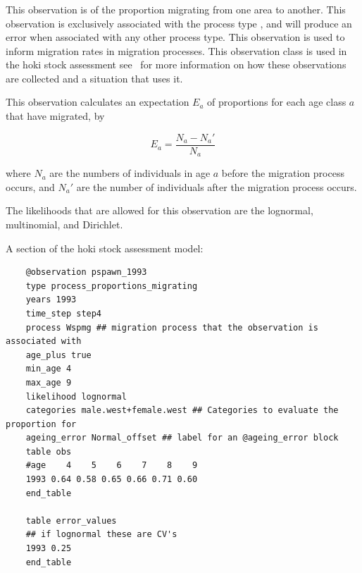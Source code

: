 \subsubsection{ \label{sec:Proportions-migrating}} \label{sec:Observation-ProportionsMigrating}

This observation is of the proportion migrating from one area to another. This observation is exclusively associated with the process type , and will produce an error when associated with any other process type. This observation is used to inform migration rates in migration processes. This observation class is used in the hoki stock assessment see~\cite{francis_03} for more information on how these observations are collected and a situation that uses it.

This observation calculates an expectation $E_a$ of proportions for each age class $a$ that have migrated, by

\begin{equation}
	E_a = \frac{N_a - N_a'}{N_a}
\end{equation}

where $N_a$ are the numbers of individuals in age $a$ before the migration process occurs, and $N_a'$ are the number of individuals after the migration process occurs.

The likelihoods that are allowed for this observation are the lognormal, multinomial, and Dirichlet.

A section of the hoki stock assessment model:

{\small{\begin{verbatim}
	@observation pspawn_1993
	type process_proportions_migrating
	years 1993
	time_step step4
	process Wspmg ## migration process that the observation is associated with
	age_plus true
	min_age 4
	max_age 9
	likelihood lognormal
	categories male.west+female.west ## Categories to evaluate the proportion for
	ageing_error Normal_offset ## label for an @ageing_error block
	table obs
	#age    4    5    6    7    8    9
	1993 0.64 0.58 0.65 0.66 0.71 0.60
	end_table
	
	table error_values
	## if lognormal these are CV's
	1993 0.25
	end_table
\end{verbatim}}}


\subsubsection{\label{sec:Observation-TagRecaptureByFishery}}

